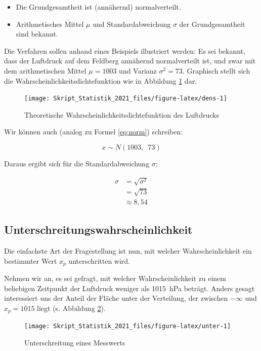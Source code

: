 \documentclass[
  11pt,
  ngerman,
  a4paper,
]{report}
\providecommand{\tightlist}{%
  \setlength{\itemsep}{0pt}\setlength{\parskip}{0pt}}
\begin{document}
\begin{itemize}
\tightlist
\item
  Die Grundgesamtheit ist (annähernd) normalverteilt.
\item
  Arithmetisches Mittel \(\mu\) und Standardabweichung \(\sigma\) der Grundgesamtheit sind bekannt.
\end{itemize}

Die Verfahren sollen anhand eines Beispiels illustriert werden: Es sei bekannt, dass der Luftdruck auf dem Feldberg annähernd normalverteilt ist, und zwar mit dem arithmetischen Mittel \(\mu=1003\) und Varianz \(\sigma^2=73\). Graphisch stellt sich die Wahrscheinlichkeitsdichtefunktion wie in Abbildung \ref{fig:dens} dar.

\begin{figure}[t]

{\centering \texttt{[image: Skript\_Statistik\_2021\_files/figure-latex/dens-1]} 

}

\caption{Theoretische Wahrscheinlichkeitsdichtefunktion des Luftdrucks}\label{fig:dens}
\end{figure}

Wir können auch (analog zu Formel \eqref{eq:norm}) schreiben:

\[
x \sim N(1003,\enspace73)
\]

Daraus ergibt sich für die Standardabweichung \(\sigma\):
\nopagebreak

\[\begin{aligned}
\sigma&=\sqrt{\sigma^2}\\
&=\sqrt{73}\\
&\approx8{,}54
\end{aligned}\]

\hypertarget{unter}{%
\subsection{Unterschreitungswahrscheinlichkeit}\label{unter}}

Die einfachste Art der Fragestellung ist nun, mit welcher Wahrscheinlichkeit ein bestimmter Wert \(x_p\) unterschritten wird.

Nehmen wir an, es sei gefragt, mit welcher Wahrscheinlichkeit zu einem beliebigen Zeitpunkt der Luftdruck weniger als 1015~hPa beträgt. Anders gesagt interessiert uns der Anteil der Fläche unter der Verteilung, der zwischen \(-\infty\) und \(x_p=1015\) liegt (s. Abbildung \ref{fig:unter}).

\begin{figure}[H]

{\centering \texttt{[image: Skript\_Statistik\_2021\_files/figure-latex/unter-1]} 

}

\caption{Unterschreitung eines Messwerts}\label{fig:unter}
\end{figure}
\end{document}
